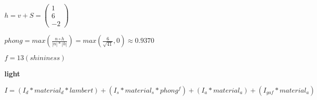 $
    h
=
    v + S
=
    \left(\begin{array}{c}
        1\\
        6\\
        -2
    \end{array}\right)
$

$
    phong
=
    max\left(
        \frac{n \circ h}{|n| * |h|}
    \right)
=
    max\left(
        \frac{6}{\sqrt{41}},
        0
    \right)
\approx
    0.9370
$

$ f = 13 (shininess) $

\textbf{light}

$
    I
=
    \left(
        I_d
        *
        material_d
        *
        lambert
    \right)
    +
    \left(
        I_s
        *
        material_s
        *
        phong^{f}
    \right)
    +
    \left(
        I_a
        *
        material_a
    \right)
    +
    \left(
        I_{gaf}
        *
        material_a
    \right)
$


